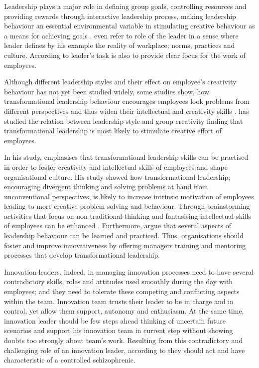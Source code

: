 Leadership plays a major role in defining group goals, controlling resources and providing rewards through interactive leadership process, making leadership behaviour an essential environmental variable in stimulating creative behaviour as a means for achieving goals \citep{redmond1993putting}. \citet{katz1978social} even refer to role of the leader in a sense where leader defines by his example the reality of workplace; norms, practices and culture. According to \citet{barczak1989leadership} leader's task is also to provide clear focus for the work of employees. 

Although different leadership styles and their effect on employee's creativity behaviour has not yet been studied widely, some studies show, how transformational leadership behaviour encourages employees look problems from different perspectives and thus widen their intellectual and creativity skills \citep{jung2001transformational,sosik1998transformational}. \citet{jung2001transformational} has studied the relation between leadership style and group creativity finding that transformational leadership is most likely to stimulate creative effort of employees. 
 
In his study, \citet{jung2001transformational} emphasises that transformational leadership skills can be practised in order to foster creativity and intellectual skills of employees and shape organisational culture. His study showed how transformational leadership; encouraging divergent thinking and solving problems at hand from unconventional perspectives, is likely to increase intrinsic motivation of employees leading to more creative problem solving and behaviour.  Through brainstorming activities that focus on non-traditional thinking and fantasising intellectual skills of employees can be enhanced \citep{sosik1998transformational}. Furthermore, \citet{jung2003role} argue that several aspects of leadership behaviour can be learned and practiced. Thus, organisations should foster and improve innovativeness by offering managers training and mentoring processes that develop transformational leadership. 

Innovation leaders, indeed, in managing innovation processes need to have several contradictory skills, roles and attitudes used smoothly during the day with employees; and they need to tolerate these competing and conflicting aspects within the team. Innovation team trusts their leader to be in charge and in control, yet allow them support, autonomy and enthusiasm.  At the same time, innovation leader should be few steps ahead thinking of uncertain future scenarios and support his innovation team in current step without showing doubts too strongly about team's work. \citep{buijs2007innovation} Resulting from this contradictory and challenging role of an innovation leader, according to \citet{buijs2007innovation} they should act and have characteristic of a controlled schizophrenic. 

